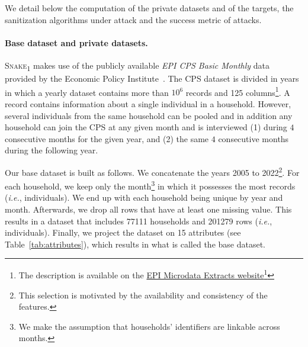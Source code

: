 \documentclass{article}
\newcommand{\myhref}[2]{\href{#1}{#2}\footnote{\url{#1}}}
\newcommand{\name}{\textsc{Snake}\xspace}
\begin{document}
We detail below the computation of the private datasets and of the targets, the sanitization algorithms under attack and the success metric of attacks.

\paragraph{Base dataset and private datasets.}

\name\textsubscript{1} makes use of the publicly available \emph{EPI CPS Basic Monthly} data provided by the Economic Policy Institute~\cite{epi_microdata}.
The CPS dataset is divided in years in which a yearly dataset contains more than $10^6$ records and 125 columns\footnote{The description is available on the \myhref{https://microdata.epi.org/variables/}{EPI Microdata Extracts website}}.
A record contains information about a single individual in a household.
However, several individuals from the same household can be pooled and in addition any household can join the CPS at any given month and is interviewed (1) during $4$ consecutive months for the given year, and (2) the same $4$ consecutive months during the following year.

Our base dataset is built as follows.
We concatenate the years 2005 to 2022\footnote{This selection is motivated by the availability and consistency of the features.}.
For each household, we keep only the month\footnote{We make the assumption that households' identifiers are linkable across months.} in which it possesses the most records (\emph{i.e.}, individuals). We end up with each household being unique by year and month.
Afterwards, we drop all rows that have at least one missing value.
This results in a dataset that includes 77111 households and 201279 rows (\emph{i.e.}, individuals). Finally, we project the dataset on 15 attributes (see Table~\ref{tab:attributes}), which results in what is called the base dataset.
\end{document}
